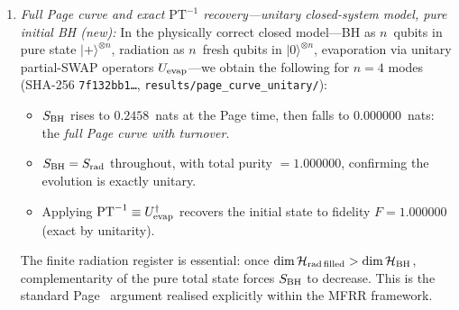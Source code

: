 \documentclass[11pt,twocolumn]{article}
\theoremstyle{remark}
\begin{document}
\begin{enumerate}[label=\arabic*.]
\item \textit{Full Page curve and exact $\mathrm{PT}^{-1}$ recovery---unitary
closed-system model, pure initial BH (new):} In the physically correct closed model---BH
as $n$~qubits in pure state $|{+}\rangle^{\otimes n}$, radiation as $n$~fresh
qubits in $|0\rangle^{\otimes n}$, evaporation via unitary partial-SWAP
operators $U_{\rm evap}$---we obtain the following for $n=4$ modes
(SHA-256 \texttt{7f132bb1\ldots}, \texttt{results/page\_curve\_unitary/}):
\begin{itemize}[nosep]
  \item $S_{\rm BH}$ rises to $0.2458$~nats at the Page time, then falls to
    $0.000000$~nats: the \emph{full Page curve with turnover}.
  \item $S_{\rm BH} = S_{\rm rad}$ throughout, with total purity $= 1.000000$,
    confirming the evolution is exactly unitary.
  \item Applying $\mathrm{PT}^{-1} \equiv U_{\rm evap}^\dagger$ recovers the
    initial state to fidelity $F = 1.000000$ (exact by unitarity).
\end{itemize}
The finite radiation register is essential: once $\dim\mathcal{H}_{\rm rad\,filled}
> \dim\mathcal{H}_{\rm BH}$, complementarity of the pure total state forces
$S_{\rm BH}$ to decrease. This is the standard Page~\cite{Page1993} argument
realised explicitly within the MFRR framework.


\end{enumerate}
\end{document}
